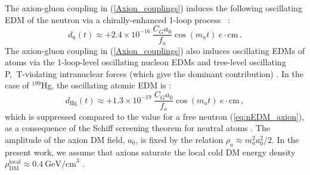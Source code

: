 The axion-gluon coupling in (\ref{Axion_couplings}) induces the following oscillating EDM of the neutron via a chirally-enhanced 1-loop process~%
\cite{tuningfootnote,Witten1979,*Witten1979B,Pospelov1999}:
\begin{equation}
\label{eq:nEDM_axion}
d_\mathrm{n}(t) \approx +2.4 \times 10^{-16} ~ \frac{C_G a_0}{f_a} \cos(m_a t) ~ e \cdot \textrm{cm} \, .
\end{equation}
The axion-gluon coupling in (\ref{Axion_couplings}) also induces oscillating EDMs of atoms via the 1-loop-level oscillating nucleon EDMs and tree-level oscillating P,~T-violating intranuclear forces (which give the dominant contribution) \cite{Stadnik2014A,Flambaum1984EDM,*Flambaum1984EDMB}.
In the case of $^{199}$Hg, the oscillating atomic EDM is \cite{Stadnik2014A,StadnikThesis,Flambaum1985EDM,Flambaum1985EDMB,Flambaum2002EDM,Dmitriev2003A,Dmitriev2003B,Dmitriev2005,Engel2005,Engel2010}:
\begin{equation}
\label{199Hg-EDM_axion}
d_{\textrm{Hg}}(t) \approx +1.3 \times 10^{-19} ~ \frac{C_G a_0}{f_a} \cos(m_a t) ~ e \cdot \textrm{cm} \, ,
\end{equation}
which is suppressed compared to the value for a free neutron (\ref{eq:nEDM_axion}), as a consequence of the Schiff screening theorem for neutral atoms \cite{Schiff1963}.
The amplitude of the axion DM field, $a_0$, is fixed by the relation $\rho_a \approx m_a^2 a_0^2 /2$.
In the present work, we assume that axions saturate the local cold DM energy density $\rho_{\mathrm{DM}}^{\mathrm{local}} \approx 0.4~\textrm{GeV/cm}^3$ \cite{Catena2010}.






